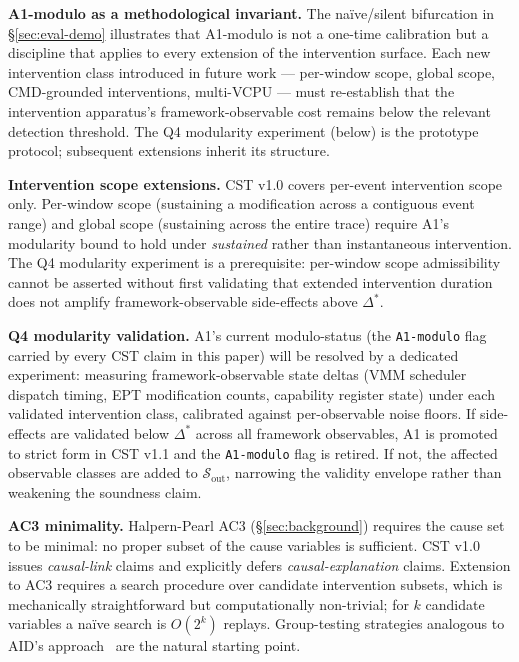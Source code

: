 \documentclass[conference]{IEEEtran}
\newcommand{\Dstar}{\Delta^{*}}
\begin{document}
\textbf{A1-modulo as a methodological invariant.} The
naïve/silent bifurcation in \S\ref{sec:eval-demo} illustrates that
A1-modulo is not a one-time calibration but a discipline that
applies to every extension of the intervention surface. Each new
intervention class introduced in future work --- per-window scope,
global scope, CMD-grounded interventions, multi-VCPU --- must
re-establish that the intervention apparatus's framework-observable
cost remains below the relevant detection threshold. The Q4
modularity experiment (below) is the prototype protocol; subsequent
extensions inherit its structure.

\textbf{Intervention scope extensions.} CST v1.0 covers per-event
intervention scope only. Per-window scope (sustaining a modification
across a contiguous event range) and global scope (sustaining
across the entire trace) require A1's modularity bound to hold
under \emph{sustained} rather than instantaneous intervention. The
Q4 modularity experiment is a prerequisite: per-window scope
admissibility cannot be asserted without first validating that
extended intervention duration does not amplify framework-observable
side-effects above $\Dstar$.

\textbf{Q4 modularity validation.} A1's current modulo-status (the
\texttt{A1-modulo} flag carried by every CST claim in this paper)
will be resolved by a dedicated experiment: measuring
framework-observable state deltas (VMM scheduler dispatch timing,
EPT modification counts, capability register state) under each
validated intervention class, calibrated against per-observable
noise floors. If side-effects are validated below $\Dstar$ across
all framework observables, A1 is promoted to strict form in CST
v1.1 and the \texttt{A1-modulo} flag is retired. If not, the
affected observable classes are added to
$\mathcal{S}_\text{out}$, narrowing the validity envelope rather
than weakening the soundness claim.

\textbf{AC3 minimality.} Halpern-Pearl AC3
(\S\ref{sec:background}) requires the cause set to be minimal:
no proper subset of the cause variables is sufficient. CST v1.0
issues \emph{causal-link} claims and explicitly defers
\emph{causal-explanation} claims. Extension to AC3 requires a
search procedure over candidate intervention subsets, which is
mechanically straightforward but computationally non-trivial; for
$k$ candidate variables a naïve search is $O(2^k)$ replays.
Group-testing strategies analogous to AID's
approach~\cite{fariha2020aid} are the natural starting point.
\end{document}
